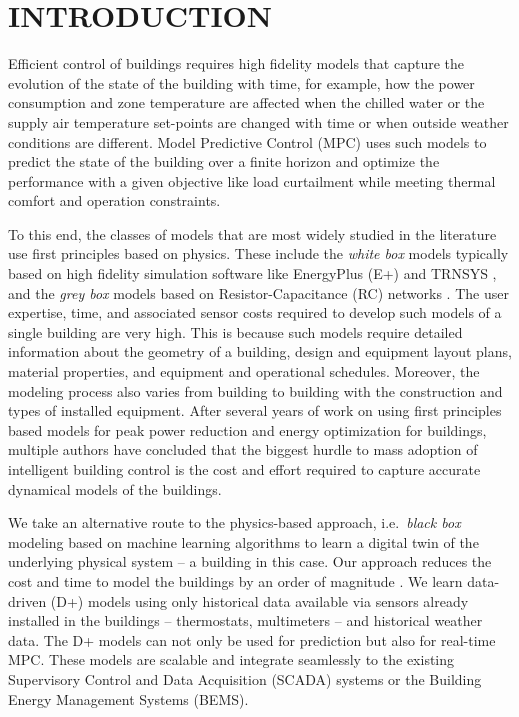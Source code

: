 \section{INTRODUCTION}
\label{S:intro}

Efficient control of buildings requires high fidelity models that capture the evolution of the state of the building with time, for example, how the power consumption and zone temperature are affected when the chilled water or the supply air temperature set-points are changed with time or when outside weather conditions are different.
Model Predictive Control (MPC) uses such models to predict the state of the building over a finite horizon and optimize the performance with a given objective like load curtailment while meeting thermal comfort and operation constraints.

To this end, the classes of models that are most widely studied in the literature use first principles based on physics. 
These include the \textit{white box} models typically based on high fidelity simulation software like EnergyPlus (E+) \cite{Deru2011} and TRNSYS \cite{Transys1975}, and the \textit{grey box} models based on Resistor-Capacitance (RC) networks \cite{Deng2010}.
The user expertise, time, and associated sensor costs required to develop such models of a single building are very high.
This is because such models require detailed information about the geometry of a building, design and equipment layout plans, material properties, and equipment and operational schedules. 
Moreover, the modeling process also varies from building to building with the construction and types of installed equipment. 
After several years of work on using first principles based models for peak power reduction and energy optimization for buildings, multiple authors \cite{Sturzenegger2016,vzavcekova2014} have concluded that the biggest hurdle to mass adoption of intelligent building control is the cost and effort required to capture accurate dynamical models of the buildings.

We take an alternative route to the physics-based approach, i.e.~\textit{black box} modeling based on machine learning algorithms to learn a digital twin of the underlying physical system -- a building in this case.
Our approach reduces the cost and time to model the buildings by an order of magnitude \cite{JainICCPS2018,Smarra2018,JainTCPS2018,JainCDC2017,JainACC2017,nghiemetal16gp,behletal15dradvisor}.
We learn data-driven (D+) models using only historical data available via sensors already installed in the buildings -- thermostats, multimeters -- and historical weather data.
The D+ models can not only be used for prediction but also for real-time MPC.
These models are scalable and integrate seamlessly to the existing Supervisory Control and Data Acquisition (SCADA) systems  or the Building Energy Management Systems (BEMS).

